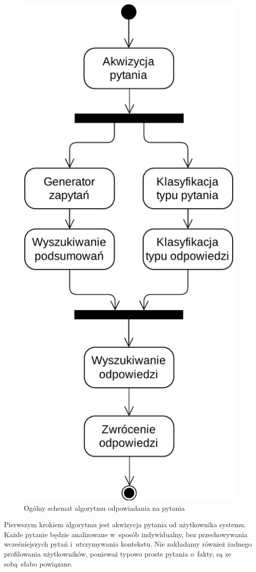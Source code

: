 \begin{figure}[h]
    \centering
    \includegraphics[width=0.7\columnwidth]{figures/WEDT-Algorytm.pdf}
    \caption{Ogólny schemat algorytmu odpowiadania na pytania}
    \label{fig:algorithm-overview}
\end{figure}

Pierwszym krokiem algorytmu jest akwizycja pytania od użytkownika systemu. Każde pytanie będzie analizowane w~sposób indywidualny, bez przechowywania wcześniejszych pytań i~utrzymywania kontekstu. Nie zakładamy również żadnego profilowania użytkowników, ponieważ typowo proste pytania o~fakty, są ze sobą słabo powiązane.

